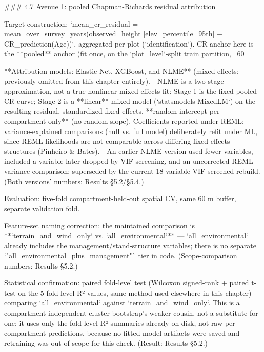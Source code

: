 \documentclass[11pt,a4paper]{report}
\begin{document}
### 4.7 Avenue 1: pooled Chapman-Richards residual attribution

Target construction: `mean_cr_residual = mean_over_survey_years(observed_height [elev_percentile_95th] − CR_prediction(Age))`, aggregated per plot (`identification`). CR anchor here is the **pooled** anchor (fit once, on the `plot_level`-split train partition, ~60%

**Attribution models: Elastic Net, XGBoost, and NLME** (mixed-effects; previously omitted from this chapter entirely).
- NLME is a two-stage approximation, not a true nonlinear mixed-effects fit: Stage 1 is the fixed pooled CR curve; Stage 2 is a **linear** mixed model (`statsmodels MixedLM`) on the resulting residual, standardized fixed effects, **random intercept per compartment only** (no random slope). Coefficients reported under REML; variance-explained comparisons (null vs. full model) deliberately refit under ML, since REML likelihoods are not comparable across differing fixed-effects structures (Pinheiro & Bates).
- An earlier NLME version used fewer variables, included a variable later dropped by VIF screening, and an uncorrected REML variance-comparison; superseded by the current 18-variable VIF-screened rebuild. (Both versions' numbers: Results §5.2/§5.4.)

Evaluation: five-fold compartment-held-out spatial CV, same 60 m buffer, separate validation fold.

Feature-set naming correction: the maintained comparison is **`terrain_and_wind_only` vs. `all_environmental`** — `all_environmental` already includes the management/stand-structure variables; there is no separate `"all_environmental_plus_management"` tier in code. (Scope-comparison numbers: Results §5.2.)

Statistical confirmation: paired fold-level test (Wilcoxon signed-rank + paired t-test on the 5 fold-level R² values, same method used elsewhere in this chapter) comparing `all_environmental` against `terrain_and_wind_only`. This is a compartment-independent cluster bootstrap's weaker cousin, not a substitute for one: it uses only the fold-level R² summaries already on disk, not raw per-compartment predictions, because no fitted model artifacts were saved and retraining was out of scope for this check. (Result: Results §5.2.)
\end{document}
